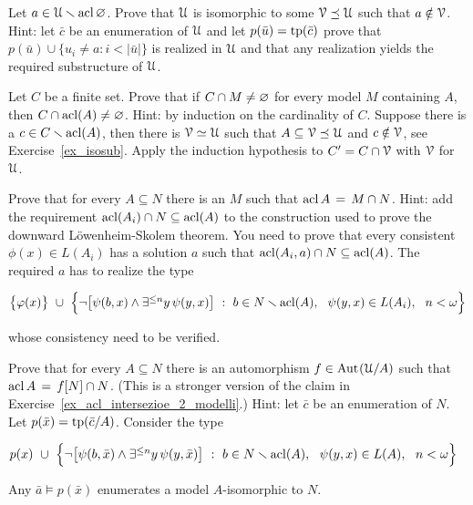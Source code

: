 \begin{exercise}\label{ex_isosub}
Let $a\in\EuScript U\smallsetminus\mathop{\rm acl}\varnothing$.
Prove that $\EuScript U$ is isomorphic to some $\EuScript V\preceq \EuScript U$ such that $a\notin\EuScript V$.
Hint: let $\bar c$ be an enumeration of $\EuScript U$ and let $p(\bar u)={\rm tp}(\bar c)$ prove that 
$p(\bar u)\cup\big\{ u_i\neq a :i<|\bar u|\big\}$ is realized in $\EuScript U$ and 
that any realization yields the required substructure of $\EuScript U$.\QED
\end{exercise}

\begin{exercise}\label{pofu2}
Let $C$ be a finite set.
Prove that if $C\cap M\neq\varnothing$ for every model $M$ containing $A$, then $C\cap\mathop{\rm acl}(A)\neq\varnothing$.
Hint: by induction on the cardinality of $C$.
Suppose there is a $c\in C\smallsetminus\mathop{\rm acl}(A)$, then there is $\EuScript V\simeq\EuScript U$ such that 
$A\subseteq\EuScript V\preceq\EuScript U$ and $c\notin\EuScript V$, see Exercise~\ref{ex_isosub}.
Apply the induction hypothesis to $C'=C\cap\EuScript V$ with $\EuScript V$ for $\EuScript U$.\QED
\end{exercise}

\begin{exercise}\label{ex_acl_intersezioe_2_modelli}
Prove that for every $A\subseteq N$ there is an $M$ such that $\mathop{\rm acl} A\,=\,M\cap N$.
Hint: add the requirement $\mathop{\rm acl}(A_i)\cap N\subseteq\mathop{\rm acl}(A)$ to the construction 
used to prove the downward L\"owenheim-Skolem theorem.
You need to prove that every consistent $\phi(x)\in L(A_i)$ has a solution $a$ such that 
$\mathop{\rm acl}(A_i,a)\cap N\subseteq\mathop{\rm acl}(A)$.
The required $a$ has to realize the type

\hfil$\big\{\phi(x)\big\}\ \cup\ \Big\{\neg\big[\psi(b,x)\wedge\E^{\le n}y\,\psi(y,x)\big]
\ :\ 
b\in N\sm\acl(A),\ \ \psi(y,x)\in L(A_i),\ \ n<\omega\Big\}$

whose consistency need to be verified.
\end{exercise}

\begin{exercise}\label{ex_acl_intersezione_2_modelli_iso}
Prove that for every $A\subseteq N$ there is an automorphism $f\in{\rm Aut\kern.15ex}(\EuScript U/A)$ such that 
$\mathop{\rm acl} A\,=\,f[N]\cap N$. 
(This is a stronger version of the claim in Exercise~\ref{ex_acl_intersezioe_2_modelli}.) 
Hint: let $\bar c$ be an enumeration of $N$.
Let $p(\bar x)={\rm tp}(\bar c/A)$. 
Consider the type

\hfil$p(x)\ \cup\ \Big\{\neg\big[\psi(b,\bar x)\wedge\E^{\le n}y\,\psi(y,\bar x)\big]
\ :\ 
b\in N\sm\acl(A),\ \ \psi(y,x)\in L(A),\ \ n<\omega\Big\}$

Any $\bar a\models p(\bar x)$ enumerates a model $A$-isomorphic to $N$.\QED
\end{exercise}

